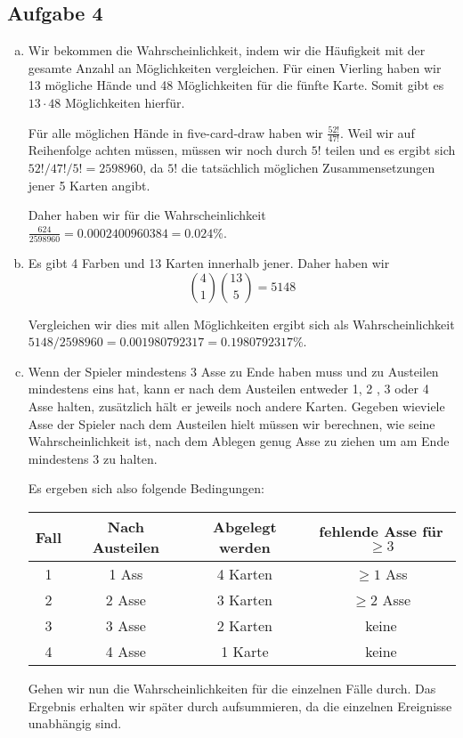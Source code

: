 \subsection*{Aufgabe 4}
\begin{enumerate}[a)]
  \item Wir bekommen die Wahrscheinlichkeit, indem wir die Häufigkeit mit der gesamte Anzahl an Möglichkeiten vergleichen. Für einen Vierling haben wir 13 mögliche Hände und 48 Möglichkeiten für die fünfte Karte. Somit gibt es $13 \cdot 48$ Möglichkeiten hierfür.

  Für alle möglichen Hände in five-card-draw haben wir $\frac{52!}{47!}$. Weil wir auf Reihenfolge achten müssen, müssen wir noch durch $5!$ teilen und es ergibt sich $52! / 47! / 5! = 2 598 960$, da $5!$ die tatsächlich möglichen Zusammensetzungen jener 5 Karten angibt.

  Daher haben wir für die Wahrscheinlichkeit $\frac{624}{2 598 960} = 0.0002400960384 = 0.024 \%$.

  \item Es gibt 4 Farben und 13 Karten innerhalb jener. Daher haben wir \[ \binom{4}{1} \binom{13}{5} = 5148 \]

  Vergleichen wir dies mit allen Möglichkeiten ergibt sich als Wahrscheinlichkeit $5148 / 2598960=0.001980792317 = 0.1980792317 \%$.

  \item Wenn der Spieler mindestens 3 Asse zu Ende haben muss und zu Austeilen mindestens eins hat, kann er nach dem Austeilen entweder 1, 2 , 3 oder 4 Asse halten, zusätzlich hält er jeweils noch andere Karten. Gegeben wieviele Asse der Spieler nach dem Austeilen hielt müssen wir berechnen, wie seine Wahrscheinlichkeit ist, nach dem Ablegen genug Asse zu ziehen um am Ende mindestens 3 zu halten.

  Es ergeben sich also folgende Bedingungen:

  \begin{tabular}{c c c c}
    Fall & Nach Austeilen & Abgelegt werden & fehlende Asse für $\geq 3$\\
    \hline
    1 & 1 Ass & 4 Karten & $\geq 1$ Ass \\
    2 & 2 Asse & 3 Karten & $\geq 2$ Asse \\
    3 & 3 Asse & 2 Karten & keine \\
    4 & 4 Asse & 1 Karte & keine \\
  \end{tabular}

  Gehen wir nun die Wahrscheinlichkeiten für die einzelnen Fälle durch. Das Ergebnis erhalten wir später durch aufsummieren, da die einzelnen Ereignisse unabhängig sind.


\end{enumerate}
